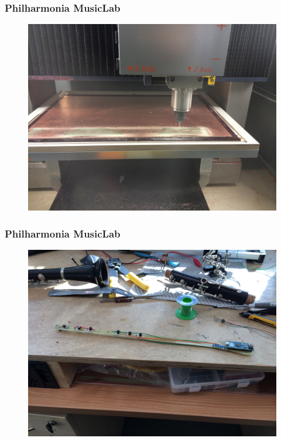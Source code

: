 \begin{frame}
	\frametitle{Philharmonia MusicLab}

	\begin{figure}
		\includegraphics[scale=.08]{assets/musiclab_03}
	\end{figure}

\end{frame}


\begin{frame}
	\frametitle{Philharmonia MusicLab}

	\begin{figure}
		\includegraphics[scale=.08]{assets/musiclab_04}
	\end{figure}

\end{frame}


